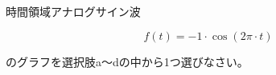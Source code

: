 時間領域アナログサイン波

\[
f(t) = -1 \cdot \cos( 2 \pi \cdot t )
\]

\bigskip
\noindent  のグラフを選択肢a〜dの中から1つ選びなさい。
